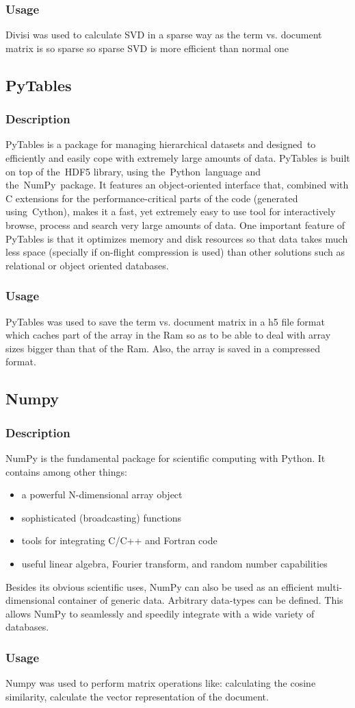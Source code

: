 \subsubsection{Usage}
Divisi was used to calculate SVD in a sparse way as the term vs. document matrix is so sparse so sparse SVD is more efficient than normal one
\subsection{PyTables}
\subsubsection{Description}
PyTables is a package for managing hierarchical datasets and designed to efficiently and easily cope with extremely large amounts of data. 
PyTables is built on top of the HDF5 library, using the Python language and the NumPy package. It features an object-oriented interface that, combined with C extensions for the performance-critical parts of the code (generated using Cython), makes it a fast, yet extremely easy to use tool for interactively browse, process and search very large amounts of data. One important feature of PyTables is that it optimizes memory and disk resources so that data takes much less space (specially if on-flight compression is used) than other solutions such as relational or object oriented databases.
\subsubsection{Usage}
PyTables was used to save the term vs. document matrix in a h5 file format which caches part of the array in the Ram so as to be able to deal with array sizes bigger than that of the Ram. Also, the array is saved in a compressed format.
\subsection{Numpy}
\subsubsection{Description}
NumPy is the fundamental package for scientific computing with Python. It contains among other things:
\begin{itemize}
\item a powerful N-dimensional array object
\item sophisticated (broadcasting) functions
\item tools for integrating C/C++ and Fortran code
\item useful linear algebra, Fourier transform, and random number capabilities
\end{itemize}
Besides its obvious scientific uses, NumPy can also be used as an efficient multi-dimensional container of generic data. Arbitrary data-types can be defined. This allows NumPy to seamlessly and speedily integrate with a wide variety of databases.
\subsubsection{Usage}
Numpy was used to perform matrix operations like: calculating the cosine similarity, calculate the vector representation of the document.


